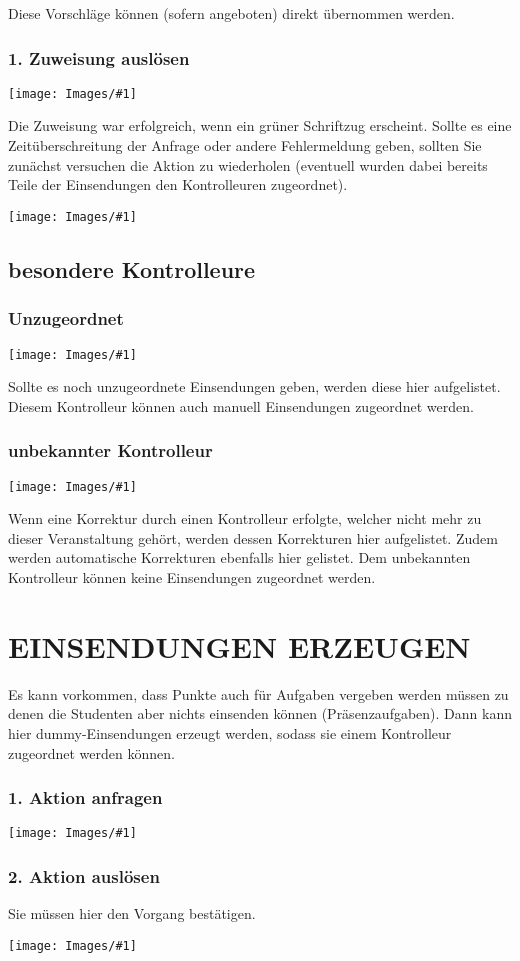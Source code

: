 \documentclass[12pt,a4paper,final]{scrartcl}
\numberwithin{equation}{section}
\newenvironment{Bilder}
  {\par\raggedbottom\null\noindent\minipage{\textwidth}\centering}
  {\endminipage\vspace{0.7cm}}
\newcommand{\tbild}[1]{%
\begin{Bilder}
 \texttt{[image: Images/\#1]}
	\end{Bilder}
}
\begin{document}
Diese Vorschläge können (sofern angeboten) direkt übernommen werden.

\newpage
\subsubsection*{1. Zuweisung auslösen}
\tbild{manG.png}

Die Zuweisung war erfolgreich, wenn ein grüner Schriftzug erscheint. Sollte es eine Zeitüberschreitung der Anfrage oder andere Fehlermeldung geben, sollten Sie zunächst versuchen die Aktion zu wiederholen (eventuell wurden dabei bereits Teile der Einsendungen den Kontrolleuren zugeordnet).
\tbild{manC.png}

\subsection{besondere Kontrolleure}
\subsubsection*{Unzugeordnet}
\tbild{manD}
Sollte es noch unzugeordnete Einsendungen geben, werden diese hier aufgelistet. Diesem Kontrolleur können auch manuell Einsendungen zugeordnet werden.

\newpage
\subsubsection*{unbekannter Kontrolleur}
\tbild{manE}
Wenn eine Korrektur durch einen Kontrolleur erfolgte, welcher nicht mehr zu dieser Veranstaltung gehört, werden dessen Korrekturen hier aufgelistet. Zudem werden automatische Korrekturen ebenfalls hier gelistet. Dem unbekannten Kontrolleur können keine Einsendungen zugeordnet werden.

\newpage
\section{EINSENDUNGEN ERZEUGEN}
Es kann vorkommen, dass Punkte auch für Aufgaben vergeben werden müssen zu denen die Studenten aber nichts einsenden können (Präsenzaufgaben). Dann kann hier dummy-Einsendungen erzeugt werden, sodass sie einem Kontrolleur zugeordnet werden können.
\subsubsection*{1. Aktion anfragen}
\tbild{makeA.png}

\subsubsection*{2. Aktion auslösen}
Sie müssen hier den Vorgang bestätigen.
\tbild{makeB.png}
\end{document}
